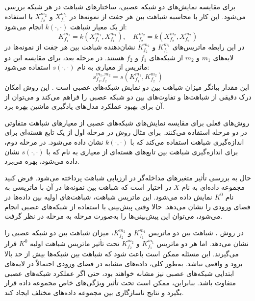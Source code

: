 برای مقایسه نمایش‌های دو شبکه عصبی، ساختارهای شباهت در هر شبکه بررسی می‌شود. این کار با محاسبه شباهت بین هر جفت از نمونه‌ها در \(X^{m_1}_{f_1}\) و \(X^{m_2}_{f_2}\) با استفاده از یک معیار شباهت \( k(\cdot, \cdot) \) انجام می‌شود:
\begin{equation}
	K^{m_1}_{f_1} = k(X^{m_1}_{f_1}, X^{m_1}_{f_1}), \quad K^{m_2}_{f_2} = k(X^{m_2}_{f_2}, X^{m_2}_{f_2})
	\label{eq_dCKA_Kernel}
\end{equation}
در این رابطه ماتریس‌های \(K^{m_1}_{f_1}\) و \(K^{m_2}_{f_2}\) نشان‌دهنده شباهت بین هر جفت از نمونه‌ها در لایه‌های \(m_1\) و \(m_2\) از شبکه‌های \(f_1\) و \(f_2\) هستند. در مرحله بعد، برای مقایسه این دو ماتریس از معیاری به نام \(s(\cdot, \cdot)\) استفاده می‌شود:
\begin{equation}
	s^{m_1,m_2}_{f_1,f_2} = s(K^{m_1}_{f_1}, K^{m_2}_{f_2})
	\label{eq_similarity}
\end{equation}
این مقدار بیانگر میزان شباهت بین دو نمایش شبکه‌های عصبی است
\cite{cui2022deconfounded}.
این روش امکان درک دقیقی از شباهت‌ها و تفاوت‌های بین دو شبکه عصبی را فراهم می‌کند و می‌توان از آن برای بهبود عملکرد مدل‌های یادگیری ماشین بهره برد.

روش‌های فعلی برای مقایسه نمایش‌های شبکه‌های عصبی از معیارهای شباهت متفاوتی در دو مرحله استفاده می‌کنند. برای مثال روش
در مرحله اول از یک تابع هسته‌ای برای اندازه‌گیری شباهت استفاده می‌کند که با \( k(\cdot,\cdot) \) نشان داده می‌شود. در مرحله دوم، برای اندازه‌گیری شباهت بین تابع‌های هسته‌ای از معیاری به نام
که با \( s(\cdot,\cdot) \) نشان داده می‌شود، بهره می‌برد.


حال به بررسی تأثیر متغیرهای مداخله‌گر%
در ارزیابی شباهت پرداخته می‌شود.
فرض کنید مجموعه داده‌ای به نام \(X\) در اختیار است که شباهت بین نمونه‌ها در آن با ماتریسی به نام
\( K^0 \)
نمایش داده می‌شود. این ماتریس شباهت، شباهت‌های اولیه بین داده‌ها در فضای ورودی را نشان می‌دهد. حالا وقتی پیش‌بینی با استفاده از شبکه‌های عصبی انجام می‌شود، می‌توان این پیش‌بینی‌ها را به‌صورت مرحله به مرحله در نظر گرفت.

در روش
%
، شباهت بین دو ماتریس \(K_{f_1}^{m_1}\) و \(K_{f_2}^{m_2}\)، میزان شباهت بین دو شبکه عصبی را نشان می‌دهد. اما هر دو ماتریس \(K_{f_1}^{m_1}\) و \(K_{f_2}^{m_2}\) تحت تأثیر ماتریس شباهت اولیه
\( K^0 \)
قرار می‌گیرند. این مسئله ممکن است باعث شود که شباهت بین شبکه‌ها بیش از حد بالا برود و واقعی نباشد. به‌طور کلی، داده‌های مشابه در فضای ورودی احتمالاً در لایه‌های ابتدایی شبکه‌های عصبی نیز مشابه خواهند بود، حتی اگر عملکرد شبکه‌های عصبی متفاوت باشد. بنابراین،
ممکن است تحت تأثیر ویژگی‌های خاص مجموعه داده قرار بگیرد و نتایج ناسازگاری بین مجموعه داده‌های مختلف ایجاد کند.


